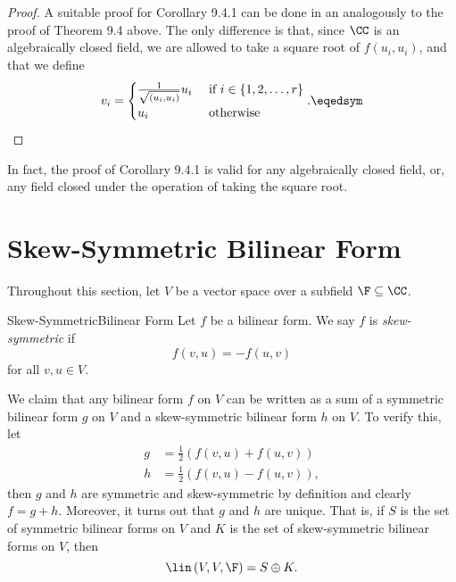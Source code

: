 \documentclass[linearalgebra]{subfiles}
\begin{document}
    \begin{proof}
        A suitable proof for Corollary 9.4.1 can be done in an analogously to the proof of Theorem 9.4 above. The only difference is that, since $\CC$ is an algebraically closed field, we are allowed to take a square root of $f\left( u_i,u_i \right)$, and that we define
        \begin{equation*}
            v_i = 
            \begin{cases} 
                \frac{1}{\sqrt{\left( u_i,u_i \right) }}u_i & \text{ if } i\in\left\lbrace 1,2,\ldots,r \right\rbrace \\ 
                u_i & \text{ otherwise }
            \end{cases}. \eqedsym
        \end{equation*}
    \end{proof}

    \noindent In fact, the proof of Corollary 9.4.1 is valid for any algebraically closed field, or, any field closed under the operation of taking the square root. 
    
    \section{Skew-Symmetric Bilinear Form}

    \begin{remark}
        Throughout this section, let $V$ be a vector space over a subfield $\F\subseteq\CC$.
    \end{remark}

    \begin{definition}{Skew-Symmetric}{Bilinear Form}
        Let $f$ be a bilinear form. We say $f$ is \emph{skew-symmetric} if
        \begin{equation*}
            f(v,u) = -f(u,v)
        \end{equation*}
        for all $v,u\in V$.
    \end{definition}
    
    \begin{remark}
        We claim that any bilinear form $f$ on $V$ can be written as a sum of a symmetric bilinear form $g$ on $V$ and a skew-symmetric bilinear form $h$ on $V$. To verify this, let
        \begin{align*}
            g & = \frac{1}{2} \left( f(v,u) + f(u,v) \right) \\
            h & = \frac{1}{2} \left( f(v,u) - f(u,v) \right) ,
        \end{align*} 
        then $g$ and $h$ are symmetric and skew-symmetric by definition and clearly $f=g+h$. Moreover, it turns out that $g$ and $h$ are unique. That is, if $S$ is the set of symmetric bilinear forms on $V$ and $K$ is the set of skew-symmetric bilinear forms on $V$, then
        \begin{equation*}
            \lin\left( V,V,\F \right) = S\oplus K.
        \end{equation*}
    \end{remark}
\end{document}
